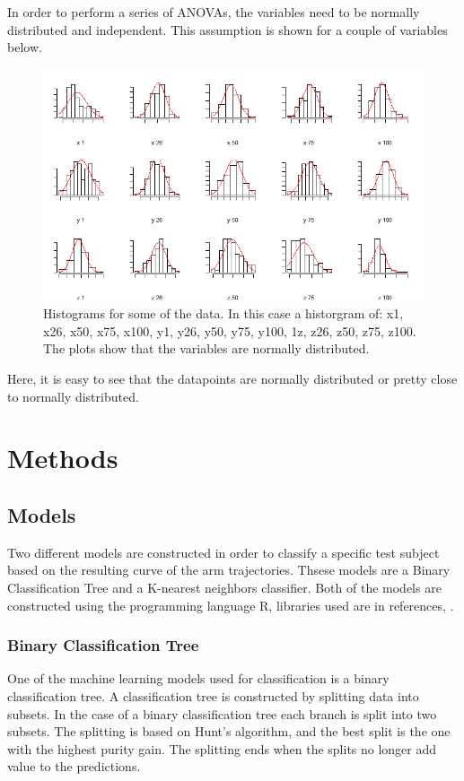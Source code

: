 \documentclass[11pt, fleqn, titlepage]{article}
\begin{document}
\noindent In order to perform a series of ANOVAs, the variables need to be normally distributed and independent. This assumption is shown for a couple of variables below.

\begin{figure}[H]
	\centering
	\includegraphics[width=0.65\linewidth]{billeder/normalAF}
	\caption{Histograms for some of the data. In this case a historgram of: x1, x26, x50, x75, x100, y1, y26, y50, y75, y100, 1z, z26, z50, z75, z100. The plots show that the variables are normally distributed.}
	\label{fig:normalaf}
\end{figure}

\noindent Here, it is easy to see that the datapoints are normally distributed or pretty close to normally distributed.

\section{Methods}

\subsection*{Models} \vspace*{-0.2cm}
Two different models are constructed in order to classify a specific test subject based on the resulting curve of the arm trajectories. Thsese models are a Binary Classification Tree and a K-nearest neighbors classifier. Both of the models are constructed using the programming language R, libraries used are in references, \cite{KNN, Tree}.
\vspace*{-0.2cm}
\subsubsection*{Binary Classification Tree}  \vspace*{-0.2cm}
One of the machine learning models used for classification is a binary classification tree. A classification tree is constructed by splitting data into subsets. In the case of a binary classification tree each branch is split into two subsets. The splitting is based on Hunt's algorithm, and the best split is the one with the highest purity gain. The splitting ends when the splits no longer add value to the predictions.
\vspace*{-0.2cm}
\end{document}

